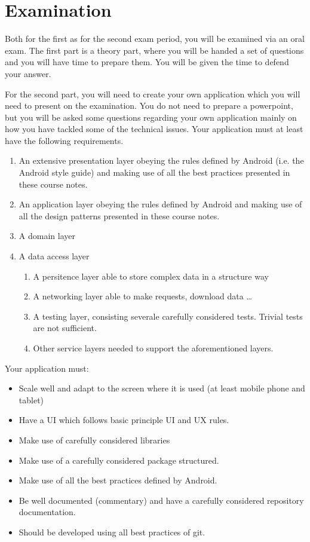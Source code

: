 \section{Examination}
Both for the first as for the second exam period, you will be examined via an oral exam.  The first part is a theory part, where 
you will be handed a set of questions and  you will have time to prepare them. You will be given the time to defend your answer.

For the second part, you will need to create your own application which you will need to present on the examination. You do not need to prepare a powerpoint, but you will be asked some questions regarding your own application mainly on how you have tackled some of the technical issues. Your application must at least have the following requirements.

\begin{enumerate}
	\item An extensive presentation layer obeying the rules defined by Android (i.e. the Android style guide) and making use of all the best practices presented in these course notes.
	\item An application layer obeying the rules defined by Android and making use of all the design patterns presented in these course notes.
	\item A domain layer
	\item A data access layer
	\begin{enumerate}
		\item A persitence layer able to store complex data in a structure way
		\item A networking layer able to make requests, download data \dots
		\item A testing layer, consisting severale carefully considered tests. Trivial tests are not sufficient. 
		\item Other service layers needed to support the aforementioned layers. 
	\end{enumerate}
\end{enumerate}

Your application must:
\begin{itemize}
	\item Scale well and adapt to the screen where it is used (at least mobile phone and tablet)
	\item Have a UI which follows basic principle UI and UX rules.
	\item Make use of carefully considered libraries
	\item Make use of a carefully considered package structured.
	\item Make use of all the best practices defined by Android.
	\item Be well documented (commentary) and have a carefully considered repository documentation.
	\item Should be developed using all best practices of git.
\end{itemize}



